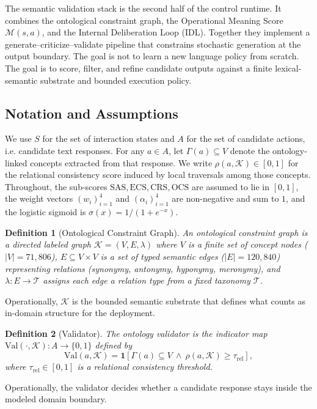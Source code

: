 \documentclass[11pt,a4paper]{article}
\newtheorem{definition}{Definition}
\begin{document}
The semantic validation stack is the second half of the control runtime. It combines the ontological constraint graph, the Operational Meaning Score $\mathcal{M}(s,a)$, and the Internal Deliberation Loop (IDL). Together they implement a generate--criticize--validate pipeline that constrains stochastic generation at the output boundary. The goal is not to learn a new language policy from scratch. The goal is to score, filter, and refine candidate outputs against a finite lexical-semantic substrate and bounded execution policy.

\subsection{Notation and Assumptions}
We use $S$ for the set of interaction states and $A$ for the set of candidate actions, i.e. candidate text responses. For any $a \in A$, let $\Gamma(a)\subseteq V$ denote the ontology-linked concepts extracted from that response. We write $\rho(a,\mathcal{K}) \in [0,1]$ for the relational consistency score induced by local traversals among those concepts. Throughout, the sub-scores $\text{SAS}, \text{ECS}, \text{CRS}, \text{OCS}$ are assumed to lie in $[0,1]$, the weight vectors $(w_i)_{i=1}^{4}$ and $(\alpha_i)_{i=1}^{4}$ are non-negative and sum to $1$, and the logistic sigmoid is $\sigma(x)=1/(1+e^{-x})$.

\begin{definition}[Ontological Constraint Graph]
\label{def:graph}
An ontological constraint graph is a directed labeled graph $\mathcal{K} = (V, E, \lambda)$ where $V$ is a finite set of concept nodes ($|V| = 71{,}806$), $E \subseteq V \times V$ is a set of typed semantic edges ($|E| = 120{,}840$) representing relations (synonymy, antonymy, hyponymy, meronymy), and $\lambda: E \rightarrow \mathcal{T}$ assigns each edge a relation type from a fixed taxonomy $\mathcal{T}$.
\end{definition}
Operationally, $\mathcal{K}$ is the bounded semantic substrate that defines what counts as in-domain structure for the deployment.

\begin{definition}[Validator]
\label{def:validator}
The ontology validator is the indicator map $\mathrm{Val}(\cdot,\mathcal{K}):A \to \{0,1\}$ defined by
\begin{equation}
  \mathrm{Val}(a,\mathcal{K}) = \mathbf{1}\!\left[\Gamma(a)\subseteq V \ \wedge\ \rho(a,\mathcal{K}) \geq \tau_{\mathrm{rel}}\right],
  \label{eq:validator}
\end{equation}
where $\tau_{\mathrm{rel}}\in[0,1]$ is a relational consistency threshold.
\end{definition}
Operationally, the validator decides whether a candidate response stays inside the modeled domain boundary.
\end{document}
